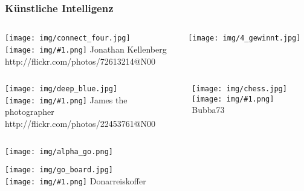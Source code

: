 \documentclass[12pt]{beamer}
\newcommand{\cc}[1]{\texttt{[image: img/\#1.png]}\hspace{1mm}}
\begin{document}
\begin{frame}
  \frametitle{Künstliche Intelligenz}
   {
    \begin{columns}
      \begin{column}{0.5 \textwidth}
        \begin{center}
          \texttt{[image: img/connect\_four.jpg]} \\
          \tiny \cc{by} Jonathan Kellenberg \\ http://flickr.com/photos/72613214@N00
        \end{center}
      \end{column}
      \begin{column}{0.5 \textwidth}
        \begin{center}
          \texttt{[image: img/4\_gewinnt.jpg]} \\
        \end{center}
      \end{column}
    \end{columns}
  }
   {
    \begin{columns}
      \begin{column}{0.5 \textwidth}
        \begin{center}
          \texttt{[image: img/deep\_blue.jpg]} \\
          \tiny \cc{by} James the photographer \\ http://flickr.com/photos/22453761@N00
        \end{center}
      \end{column}
      \begin{column}{0.5 \textwidth}
        \begin{center}
          \texttt{[image: img/chess.jpg]} \\
          \tiny \cc{by-sa} Bubba73
        \end{center}
      \end{column}
    \end{columns}
  }
   {
    \begin{center}
      \texttt{[image: img/alpha\_go.png]} \\

      \vspace{0.5cm}

      \texttt{[image: img/go\_board.jpg]} \\
      \tiny \cc{by} Donarreiskoffer
    \end{center}
  }
\end{frame}
\end{document}

